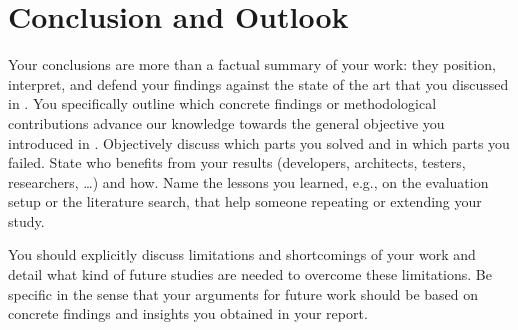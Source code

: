 \documentclass[../thesis-example-en]{subfiles}
\begin{document}
\chapter{Conclusion and Outlook}\label{sec:conclusion}

Your conclusions are more than a factual summary of your work: they position, interpret, and defend your findings against the state of the art that you discussed in .
You specifically outline which concrete findings or methodological contributions advance our knowledge towards the general objective you introduced in .
Objectively discuss which parts you solved and in which parts you failed.
State who benefits from your results (developers, architects, testers, researchers, \ldots) and how.
Name the lessons you learned, e.g., on the evaluation setup or the literature search, that help someone repeating or extending your study.

You should explicitly discuss limitations and shortcomings of your work and detail what kind of future studies are needed to overcome these limitations.
Be specific in the sense that your arguments for future work should be based on concrete findings and insights you obtained in your report.
\end{document}
